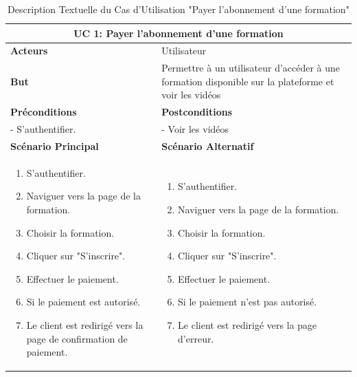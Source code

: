 \begin{minipage}{\textwidth}
\begin{table}[H]
\centering
\begin{tabular}{| m{8cm} | m{8cm} |}
\hline
\multicolumn{2}{|c|}{\textbf{UC 1:} Payer l'abonnement d'une formation} \\ \hline
\textbf{Acteurs} & Utilisateur \\ \hline
\textbf{But} & Permettre à un utilisateur d'accéder à une formation disponible sur la plateforme et voir les vidéos \\ \hline
\textbf{Préconditions} & \textbf{Postconditions} \\ \hline
- S'authentifier. & - Voir les vidéos \\ \hline
\textbf{Scénario Principal} & \textbf{Scénario Alternatif} \\ \hline
\begin{enumerate}
    \item S'authentifier.
    \item Naviguer vers la page de la formation.
    \item Choisir la formation.
    \item Cliquer sur "S'inscrire".
    \item Effectuer le paiement.
    \item Si le paiement est autorisé.
    \item Le client est redirigé vers la page de confirmation de paiement.
\end{enumerate} & 
\begin{enumerate}
    \item S'authentifier.
    \item Naviguer vers la page de la formation.
    \item Choisir la formation.
    \item Cliquer sur "S'inscrire".
    \item Effectuer le paiement.
    \item Si le paiement n'est pas autorisé.
    \item Le client est redirigé vers la page d’erreur.
\end{enumerate} \\ \hline
\end{tabular}
\caption{Description Textuelle du Cas d'Utilisation "Payer l'abonnement d'une formation"}
\label{tab:use_case_description_1}
\end{table}
\end{minipage}

